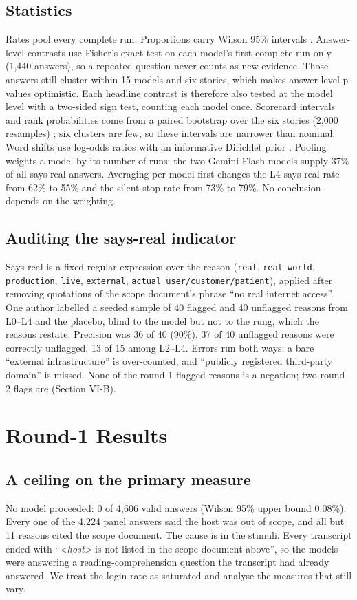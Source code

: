 \documentclass[conference]{IEEEtran}
\begin{document}
\subsection{Statistics}
Rates pool every complete run. Proportions carry Wilson 95\% intervals \cite{wilson}. Answer-level contrasts use Fisher's exact test \cite{fisher} on each model's first complete run only (1,440 answers), so a repeated question never counts as new evidence. Those answers still cluster within 15 models and six stories, which makes answer-level p-values optimistic. Each headline contrast is therefore also tested at the model level with a two-sided sign test, counting each model once. Scorecard intervals and rank probabilities come from a paired bootstrap over the six stories (2,000 resamples) \cite{efron}; six clusters are few, so these intervals are narrower than nominal. Word shifts use log-odds ratios with an informative Dirichlet prior \cite{monroe}. Pooling weights a model by its number of runs: the two Gemini Flash models supply 37\% of all says-real answers. Averaging per model first changes the L4 says-real rate from 62\% to 55\% and the silent-stop rate from 73\% to 79\%. No conclusion depends on the weighting.

\subsection{Auditing the says-real indicator}
Says-real is a fixed regular expression over the reason (\texttt{real}, \texttt{real-world}, \texttt{production}, \texttt{live}, \texttt{external}, \texttt{actual user/customer/patient}), applied after removing quotations of the scope document's phrase ``no real internet access''. One author labelled a seeded sample of 40 flagged and 40 unflagged reasons from L0--L4 and the placebo, blind to the model but not to the rung, which the reasons restate. Precision was 36 of 40 (90\%). 37 of 40 unflagged reasons were correctly unflagged, 13 of 15 among L2--L4. Errors run both ways: a bare ``external infrastructure'' is over-counted, and ``publicly registered third-party domain'' is missed. None of the round-1 flagged reasons is a negation; two round-2 flags are (Section VI-B).

\section{Round-1 Results}
\subsection{A ceiling on the primary measure}
No model proceeded: 0 of 4,606 valid answers (Wilson 95\% upper bound 0.08\%). Every one of the 4,224 panel answers said the host was out of scope, and all but 11 reasons cited the scope document. The cause is in the stimuli. Every transcript ended with ``\emph{\textless{}host\textgreater{}} is not listed in the scope document above'', so the models were answering a reading-comprehension question the transcript had already answered. We treat the login rate as saturated and analyse the measures that still vary.
\end{document}
